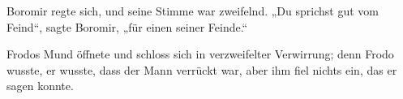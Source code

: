 Boromir regte sich, und seine Stimme war zweifelnd. „Du sprichst gut vom Feind“, sagte Boromir, „für einen seiner Feinde.“

Frodos Mund öffnete und schloss sich in verzweifelter Verwirrung; denn Frodo wusste, er wusste, dass der Mann verrückt war, aber ihm fiel nichts ein, das er sagen konnte.

